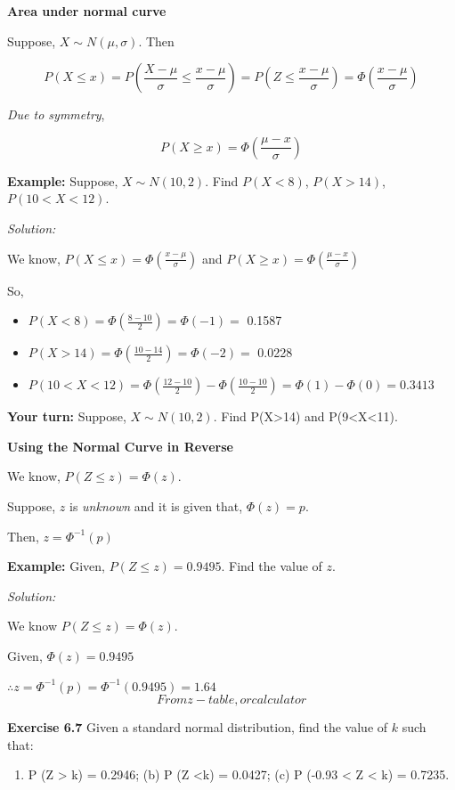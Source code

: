 \documentclass[
]{article}
\providecommand{\tightlist}{%
  \setlength{\itemsep}{0pt}\setlength{\parskip}{0pt}}
\begin{document}
\textbf{Area under normal curve}

Suppose, \(X \sim N(\mu, \sigma)\). Then

\[
P(X\le x)=P(\frac{X-\mu}{\sigma}\le \frac{x-\mu}{\sigma})=P(Z\le \frac{x-\mu}{\sigma})=\Phi(\frac{x-\mu}{\sigma})
\]

\emph{Due to symmetry},

\[
P(X\ge x)=\Phi(\frac{\mu-x}{\sigma})
\]

\textbf{Example:} Suppose, \(X \sim N(10, 2)\). Find \(P(X<8)\), \(P(X>14)\), \(P(10<X<12)\).

\emph{Solution:}

We know, \(P(X\le x)=\Phi(\frac{x-\mu}{\sigma})\) and \(P(X\ge x)=\Phi(\frac{\mu-x}{\sigma})\)

So,

\begin{itemize}
\item
  \(P(X<8)=\Phi(\frac{8-10}{2})=\Phi(-1)=\) 0.1587
\item
  \(P(X>14)=\Phi(\frac{10-14}{2})=\Phi(-2)=\) 0.0228
\item
  \(P(10<X<12)=\Phi(\frac{12-10}{2})-\Phi(\frac{10-10}{2})=\Phi(1)-\Phi(0)=0.3413\)
\end{itemize}

\textbf{Your turn:} Suppose, \(X \sim N(10, 2)\). Find P(X\textgreater14) and P(9\textless X\textless11).

\textbf{Using the Normal Curve in Reverse}

We know, \(P(Z\le z)=\Phi(z)\).

Suppose, \(z\) is \emph{unknown} and it is given that, \(\Phi(z)=p\).

Then, \(z=\Phi^{-1}(p)\)

\textbf{Example:} Given, \(P(Z \le z)=0.9495\). Find the value of \(z\).

\emph{Solution:}

We know \(P(Z\le z)=\Phi(z)\).

Given, \(\Phi(z)=0.9495\)

\(\therefore z=\Phi^{-1}(p)=\Phi^{-1}(0.9495)=1.64\) \[From z-table, or calculator\]

\textbf{Exercise 6.7}\citep{walpole_probability_2017} Given a standard normal distribution, find the value of \(k\) such that:

\begin{enumerate}
\def\labelenumi{(\alph{enumi})}
\tightlist
\item
  P (Z \textgreater{} k) = 0.2946; (b) P (Z \textless k) = 0.0427; (c) P (-0.93 \textless{} Z \textless{} k) = 0.7235.
\end{enumerate}
\end{document}
